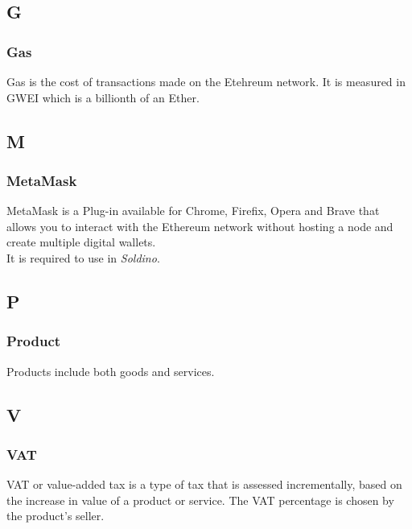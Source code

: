 	\subsection*{G}
		\subsubsection*{Gas}
		Gas is the cost of transactions made on the Etehreum network. It is 
		measured in GWEI which is a billionth of an Ether.
		
	\subsection*{M}
		\subsubsection*{MetaMask}
		MetaMask is a Plug-in available for Chrome, Firefix, Opera and Brave that 
		allows you to interact with the Ethereum network without hosting a node 
		and create multiple digital wallets\glo.
		\\It is required to use in \textit{Soldino}.
		
	\subsection*{P}
		\subsubsection*{Product}
		Products include both goods and services.
		
	\subsection*{V}
		\subsubsection*{VAT}
		VAT or value-added tax is a type of tax that is assessed incrementally, 
		based on the increase in value of a product or service. The VAT 
		percentage is chosen by the product's seller.